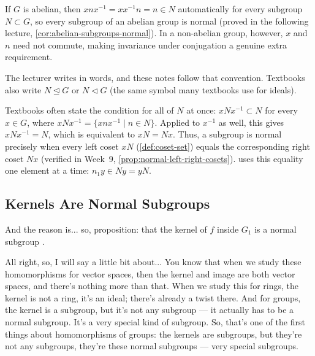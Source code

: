 \begin{aiNote}
If $G$ is abelian, then $x n x^{-1} = x x^{-1} n = n \in N$ automatically for every subgroup $N \subset G$, so every subgroup of an abelian group is normal (proved in the following lecture, \cref{cor:abelian-subgroups-normal}). In a non-abelian group, however, $x$ and $n$ need not commute, making invariance under conjugation a genuine extra requirement.
\end{aiNote}

\begin{aiNote}
The lecturer writes  in words, and these notes follow that convention. Textbooks also write $N \trianglelefteq G$ or $N \lhd G$ (the same symbol many textbooks use for ideals).
\end{aiNote}

\begin{aiNote}
Textbooks often state the condition for all of $N$ at once: $x N x^{-1} \subset N$ for every $x \in G$, where $x N x^{-1} = \{x n x^{-1} \mid n \in N\}$. Applied to $x^{-1}$ as well, this gives $x N x^{-1} = N$, which is equivalent to $x N = N x$. Thus, a subgroup is normal precisely when every left coset $x N$ (\cref{def:coset-set}) equals the corresponding right coset $N x$ (verified in Week~9, \cref{prop:normal-left-right-cosets}).  uses this equality one element at a time: $n_1 y \in N y = y N$.
\end{aiNote}

\subsection{Kernels Are Normal Subgroups}

\begin{speech}[00:47:29 - 00:48:26]
And the reason is... so, proposition: that the kernel of $f$ inside $G_1$ is a normal subgroup .

All right, so, I will say a little bit about... You know that when we study these homomorphisms for vector spaces, then the kernel and image are both vector spaces, and there's nothing more than that. When we study this for rings, the kernel is not a ring, it's an ideal; there's already a twist there. And for groups, the kernel is a subgroup, but it's not any subgroup --- it actually has to be a normal subgroup. It's a very special kind of subgroup. So, that's one of the first things about homomorphisms of groups: the kernels are subgroups, but they're not any subgroups, they're these normal subgroups --- very special subgroups.
\end{speech}

